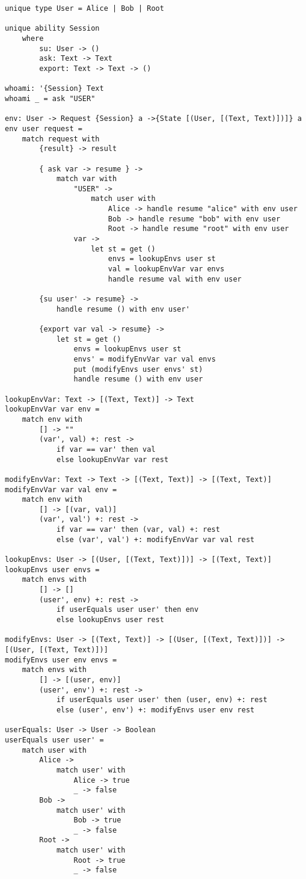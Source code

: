 \documentclass[logo,bsc,singlespacing,parskip]{infthesis}
\begin{document}
\begin{lstlisting}[language=unison]
unique type User = Alice | Bob | Root

unique ability Session
    where
        su: User -> ()
        ask: Text -> Text
        export: Text -> Text -> ()

whoami: '{Session} Text
whoami _ = ask "USER"

env: User -> Request {Session} a ->{State [(User, [(Text, Text)])]} a
env user request = 
    match request with
        {result} -> result

        { ask var -> resume } -> 
            match var with 
                "USER" ->
                    match user with 
                        Alice -> handle resume "alice" with env user
                        Bob -> handle resume "bob" with env user
                        Root -> handle resume "root" with env user
                var -> 
                    let st = get ()
                        envs = lookupEnvs user st
                        val = lookupEnvVar var envs
                        handle resume val with env user

        {su user' -> resume} -> 
            handle resume () with env user'

        {export var val -> resume} -> 
            let st = get ()
                envs = lookupEnvs user st
                envs' = modifyEnvVar var val envs
                put (modifyEnvs user envs' st) 
                handle resume () with env user

lookupEnvVar: Text -> [(Text, Text)] -> Text
lookupEnvVar var env =
    match env with
        [] -> ""
        (var', val) +: rest ->
            if var == var' then val
            else lookupEnvVar var rest

modifyEnvVar: Text -> Text -> [(Text, Text)] -> [(Text, Text)]
modifyEnvVar var val env =
    match env with
        [] -> [(var, val)]
        (var', val') +: rest ->
            if var == var' then (var, val) +: rest
            else (var', val') +: modifyEnvVar var val rest

lookupEnvs: User -> [(User, [(Text, Text)])] -> [(Text, Text)]
lookupEnvs user envs =
    match envs with
        [] -> []
        (user', env) +: rest ->
            if userEquals user user' then env
            else lookupEnvs user rest

modifyEnvs: User -> [(Text, Text)] -> [(User, [(Text, Text)])] -> [(User, [(Text, Text)])]
modifyEnvs user env envs =
    match envs with
        [] -> [(user, env)]
        (user', env') +: rest ->
            if userEquals user user' then (user, env) +: rest
            else (user', env') +: modifyEnvs user env rest

userEquals: User -> User -> Boolean
userEquals user user' =
    match user with
        Alice -> 
            match user' with 
                Alice -> true
                _ -> false
        Bob -> 
            match user' with 
                Bob -> true
                _ -> false
        Root -> 
            match user' with 
                Root -> true
                _ -> false
\end{lstlisting}
\end{document}
